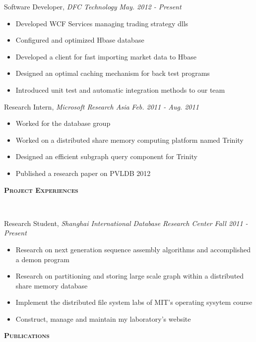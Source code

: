 \documentclass[9pt]{article}
\newenvironment{changemargin}[2]{%
  \begin{list}{}{%
    \setlength{\topsep}{0pt}%
    \setlength{\leftmargin}{#1}%
    \setlength{\rightmargin}{#2}%
    \setlength{\listparindent}{\parindent}%
    \setlength{\itemindent}{\parindent}%
    \setlength{\parsep}{\parskip}%
  }%
  \item[]}{\end{list}
}
\newcommand{\lineover}{
	\begin{changemargin}{-0.05in}{-0.05in}
		\vspace*{-8pt}
		\hrulefill \\
		\vspace*{-2pt}
	\end{changemargin}
}
\newcommand{\header}[1]{
	\begin{changemargin}{-0.5in}{-0.5in}
		\scshape{#1}\\
  	\lineover
	\end{changemargin}
}
\newenvironment{body} {
	\vspace*{-16pt}
	\begin{changemargin}{-0.25in}{-0.5in}
  }	
	{\end{changemargin}
}
\begin{document}
\begin{body}
	\vspace{14pt}
    Software Developer, \emph{DFC Technology} \hfill \emph{May. 2012 - Present}\\
    \vspace*{-4pt}
    \begin{itemize} \itemsep -0pt
    \item Developed WCF Services managing trading strategy dlls
    \item Configured and optimized Hbase database
    \item Developed a client for fast importing market data to Hbase
    \item Designed an optimal caching mechanism for back test programs
    \item Introduced unit test and automatic integration methods to our team
    \end{itemize}

    Research Intern, \emph{Microsoft Research Asia} \hfill \emph{Feb. 2011 - Aug. 2011}\\
    \vspace*{-4pt}
    \begin{itemize} \itemsep -0pt
        \item Worked for the database group
        \item Worked on a distributed share memory computing platform named Trinity
        \item Designed an efficient subgraph query component for Trinity
        \item Published a research paper on PVLDB 2012
    \end{itemize}
\end{body}

\smallskip


\header{\textbf{Project Experiences}}

\begin{body}
    \vspace{14pt}
    Research Student, \emph{Shanghai International Database Research Center} \hfill \emph{Fall 2011 - Present}
    \vspace*{-4pt}
    \begin{itemize} \itemsep -0pt
        \item Research on next generation sequence assembly algorithms and accomplished a demon program
        \item Research on partitioning and storing large scale graph within a distributed share memory database
        \item Implement the distributed file system labs of MIT's operating sysytem course
        \item Construct, manage and maintain my laboratory's website
    \end{itemize}
\end{body}
\smallskip
\header{\textbf{Publications}}
\end{document}

